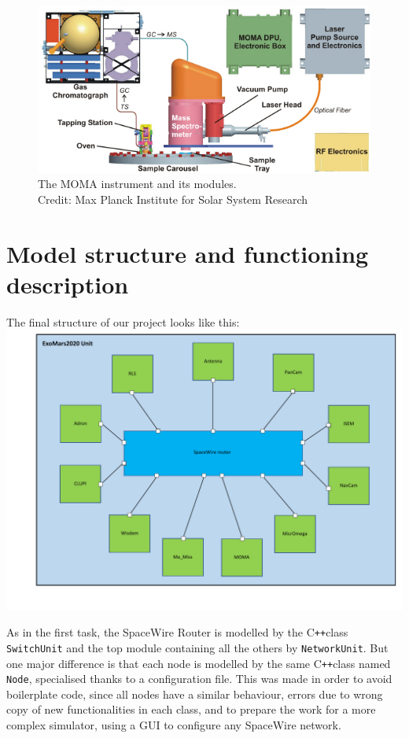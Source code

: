 \documentclass[12pt,a4paper]{article}
\newcommand{\Cpp}{C\texttt{++}}
\begin{document}
\begin{figure}[h]
\centering
\includegraphics[scale=.7]{pictures/MOMA.jpg}
\caption{The MOMA instrument and its modules.\\Credit: Max Planck Institute for Solar System Research}
\end{figure}

\pagebreak

\section{Model structure and functioning description}
The final structure of our project looks like this: \smallbreak
\includegraphics[scale=1]{pictures/structure_ExoMars2020.pdf}

As in the first task, the SpaceWire Router is modelled by the \Cpp class \texttt{SwitchUnit} and the top module containing all the others by \texttt{NetworkUnit}. But one major difference is that each node is modelled by the same \Cpp class named \texttt{Node}, specialised thanks to a configuration file. This was made in order to avoid boilerplate code, since all nodes have a similar behaviour, errors due to wrong copy of new functionalities in each class, and to prepare the work for a more complex simulator, using a GUI to configure any SpaceWire network.
\end{document}
